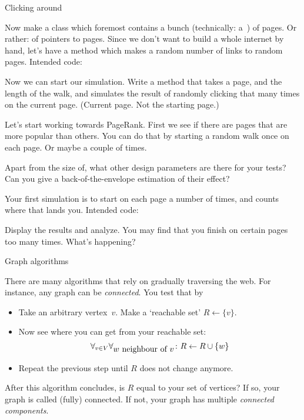  {Clicking around}

\begin{exercise}
  Now make a class  which foremost contains a bunch
  (technically: a~) of pages. Or rather: of pointers to
  pages.
  Since we don't want to build a whole internet by hand, let's have a
  method  which makes a random number of links
  to random pages.
  Intended code:

  Now we can start our simulation. Write a method 
  that takes a page, and the length of the walk, and simulates the
  result of randomly clicking that many times on the current
  page. (Current page. Not the starting page.)
\end{exercise}

Let's start working towards PageRank. First we see if there are pages
that are more popular than others. You can do that by starting a
random walk once on each page. Or maybe a couple of times.

\begin{exercise}
  Apart from the size of, what other design parameters are there for
  your tests? Can you give a back-of-the-envelope estimation of their effect?
\end{exercise}

\begin{exercise}
  Your first simulation is to start on each page a number of times,
  and counts where that lands you.
  Intended code:

  Display the results and analyze. You may find that you finish on
  certain pages too many times. What's happening?
\end{exercise}

 {Graph algorithms}

There are many algorithms that rely on gradually traversing the
web. For instance, any graph can be
\emph{connected}. You test that by
\begin{itemize}
\item Take an arbitrary vertex~$v$. Make a `reachable set'
  $R\leftarrow\{v\}$.
\item Now see where you can get from your reachable set:
  \[ \forall_{v\in V}\forall_{\hbox{$w$ neighbour of $v$}}\colon
  R\leftarrow R\cup \{w\}
  \]
\item Repeat the previous step until $R$ does not change anymore. 
\end{itemize}
After this algorithm concludes, is $R$ equal to your set of vertices?
If so, your graph is called (fully) connected. If not, your graph has
multiple
%
\emph{connected components}.

